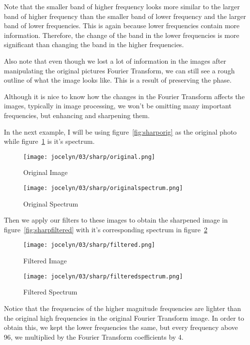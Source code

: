 \documentclass [../article.tex]{subfiles}
\begin{document}
  Note that the smaller band of higher frequency looks more similar
  to the larger band of higher frequency than the smaller band of
  lower frequency and the larger band of lower frequencies.  This is
  again because lower frequencies contain more information.
  Therefore, the change of the band in the lower frequencies is more
  significant than changing the band in the higher frequencies.

  Also note that even though we lost a lot of information in the
  images after manipulating the original pictures Fourier Transform,
  we can still see a rough outline of what the image looks like.
  This is a result of preserving the phase.

  Although it is nice to know how the changes in the Fourier
  Transform affects the images, typically in image processing, we
  won’t be omitting many important frequencies, but enhancing and
  sharpening them.

  In the next example, I will be using figure~\ref{fig:sharporig}
  as the original photo while figure~\ref{fig:sharporigspectrum}
  is it's spectrum.
  \begin{figure}[!htb]
      \texttt{[image: jocelyn/03/sharp/original.png]}
      \caption{Original Image}
      \label{fig:sharporig}
    \endminipage\hfill
      \texttt{[image: jocelyn/03/sharp/originalspectrum.png]}
      \caption{Original Spectrum}
      \label{fig:sharporigspectrum}
    \endminipage
  \end{figure}
  Then we apply our filters to these images to obtain the sharpened
  image in figure~\ref{fig:sharpfiltered} with it's corresponding
  spectrum in figure~\ref{fig:sharpfilteredspectrum}
  \begin{figure}[!htb]
      \texttt{[image: jocelyn/03/sharp/filtered.png]}
      \caption{Filtered Image}
      \label{fig:sharpfiltered}
    \endminipage\hfill
      \texttt{[image: jocelyn/03/sharp/filteredspectrum.png]}
      \caption{Filtered Spectrum}
      \label{fig:sharpfilteredspectrum}
    \endminipage
  \end{figure}
  Notice that the frequencies of the higher magnitude frequencies
  are lighter than the original high frequencies in the original
  Fourier Transform image.  In order to obtain this, we kept the
  lower frequencies the same, but every frequency above 96, we
  multiplied by the Fourier Transform coefficients by 4.
\end{document}
